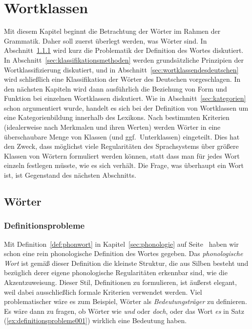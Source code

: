 \chapter{Wortklassen}
\label{sec:wortklassen}

Mit diesem Kapitel beginnt die Betrachtung der Wörter im Rahmen der Grammatik.
Daher soll zuerst überlegt werden, was Wörter sind.
In Abschnitt~\ref{sec:definitionsprobleme} wird kurz die Problematik der Definition des Wortes diskutiert.
In Abschnitt~\ref{sec:klassifikationsmethoden} werden grundsätzliche Prinzipien der Wortklassifizierung diskutiert, und in Abschnitt~\ref{sec:wortklassendesdeutschen} wird schließlich eine Klassifikation der Wörter des Deutschen vorgeschlagen.
In den nächsten Kapiteln wird dann ausführlich die Beziehung von Form und Funktion bei einzelnen Wortklassen diskutiert.
Wie in Abschnitt~\ref{sec:kategorien} schon argumentiert wurde, handelt es sich bei der Definition von Wortklassen um eine Kategorienbildung innerhalb des Lexikons.
Nach bestimmten Kriterien (idealerweise nach Merkmalen und ihren Werten) werden Wörter in eine überschaubare Menge von Klassen (und ggf.\ Unterklassen) eingeteilt.
Dies hat den Zweck, dass möglichst viele Regularitäten des Sprachsystems über größere Klassen von Wörtern formuliert werden können, statt dass man für jedes Wort einzeln festlegen müsste, wie es sich verhält.
Die Frage, was überhaupt ein Wort ist, ist Gegenstand des nächsten Abschnitts.

\section{Wörter}
\label{sec:woerter}

\subsection{Definitionsprobleme}
\label{sec:definitionsprobleme}


Mit Definition~\ref{def:phonwort} in Kapitel~\ref{sec:phonologie} auf Seite~\pageref{def:phonwort} haben wir schon eine rein phonologische Definition des Wortes gegeben.
Das \textit{phonologische Wort} ist gemäß dieser Definition die kleinste Struktur, die aus Silben besteht und bezüglich derer eigene phonologische Regularitäten erkennbar sind, wie \zB die Akzentzuweisung.
Dieser Stil, Definitionen zu formulieren, ist äußerst elegant, weil dabei ausschließlich formale Kriterien verwendet werden.
Viel problematischer wäre es zum Beispiel, Wörter als \textit{Bedeutungsträger} zu definieren.
Es wäre dann zu fragen, ob Wörter wie \textit{und} oder \textit{doch}, oder das Wort \textit{es} in Satz (\ref{ex:definitionsprobleme001}) wirklich eine Bedeutung haben.


